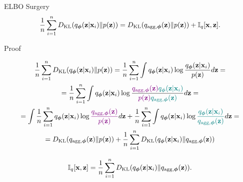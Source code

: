\documentclass{beamer}
\renewcommand{\eqpause}{}
\renewcommand{\nextonslide}[1]{#1}
\begin{document}
\begin{frame}{ELBO Surgery}
		\vspace{-0.4cm}
		\[
		    \frac{1}{n} \sum_{i=1}^n D_\mathrm{KL}(q_{\boldsymbol{\phi}}(\mathbf{z}| \mathbf{x}_i) \| p(\mathbf{z})) = D_\mathrm{KL}(q_{\text{agg}, \boldsymbol{\phi}}(\mathbf{z}) \| p(\mathbf{z})) + \mathbb{I}_q [\mathbf{x}, \mathbf{z}].
		\]
		\vspace{-0.3cm}
	\begin{block}{Proof}
		\vspace{-0.5cm}
		{\footnotesize
		\begin{multline*}
		    \frac{1}{n} \sum_{i=1}^n \KL(q_{\bphi}(\bz| \bx_i) \| p(\bz)) = \frac{1}{n} \sum_{i=1}^n \int q_{\bphi}(\bz| \bx_i) \log \frac{q_{\bphi}(\bz| \bx_i)}{p(\bz)} d \bz
		    \nextonslide{= \\= \frac{1}{n} \sum_{i=1}^n \int q_{\bphi}(\bz| \bx_i) \log \frac{{\color{violet}q_{\text{agg}, \bphi}(\bz)} {\color{teal}q_{\bphi}(\bz| \bx_i)}}{{\color{violet}p(\bz)} {\color{teal}q_{\text{agg}, \bphi}(\bz)}} d \bz}
		    \nextonslide{= \\ = \int \frac{1}{n} \sum_{i=1}^n  q_{\bphi}(\bz| \bx_i) \log {\color{violet}\frac{q_{\text{agg}, \bphi}(\bz)}{p(\bz)}} d \bz + \frac{1}{n}\sum_{i=1}^n \int q_{\bphi}(\bz| \bx_i) \log {\color{teal}\frac{q_{\bphi}(\bz| \bx_i)}{q_{\text{agg}, \bphi}(\bz)}} d \bz}
		    \nextonslide{= \\ = \KL (q_{\text{agg}, \bphi}(\bz) \| p(\bz)) + \frac{1}{n}\sum_{i=1}^n \KL(q_{\bphi}(\bz| \bx_i) \| q_{\text{agg}, \bphi}(\bz))}
		\end{multline*}
        \eqpause
		}
		\vspace{-0.4cm}
		\[
			\mathbb{I}_{q} [\mathbf{x}, \mathbf{z}] = \frac{1}{n}\sum_{i=1}^n D_\mathrm{KL}(q_{\boldsymbol{\phi}}(\mathbf{z}| \mathbf{x}_i) \| q_{\text{agg}, \boldsymbol{\phi}}(\mathbf{z})).
		\]
	\end{block}
\end{frame}
\end{document}
